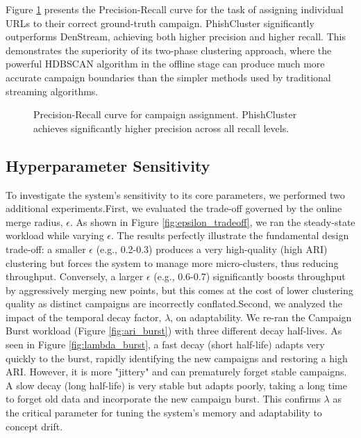 \documentclass[journal,article,submit,pdftex,moreauthors]{Definitions/mdpi}
\begin{document}
Figure \ref{fig:pr_curve} presents the Precision-Recall curve for the task of assigning individual URLs to their correct ground-truth campaign. PhishCluster significantly outperforms DenStream, achieving both higher precision and higher recall. This demonstrates the superiority of its two-phase clustering approach, where the powerful HDBSCAN algorithm in the offline stage can produce much more accurate campaign boundaries than the simpler methods used by traditional streaming algorithms.

\begin{figure}[h!]
\centering
{}
\caption{Precision-Recall curve for campaign assignment. PhishCluster achieves significantly higher precision across all recall levels.}
\label{fig:pr_curve}
\end{figure}


\subsection{Hyperparameter Sensitivity}
To investigate the system's sensitivity to its core parameters, we performed two additional experiments.First, we evaluated the trade-off governed by the online merge radius, $\epsilon$. As shown in Figure \ref{fig:epsilon_tradeoff}, we ran the steady-state workload while varying $\epsilon$. The results perfectly illustrate the fundamental design trade-off: a smaller $\epsilon$ (e.g., 0.2-0.3) produces a very high-quality (high ARI) clustering but forces the system to manage more micro-clusters, thus reducing throughput. Conversely, a larger $\epsilon$ (e.g., 0.6-0.7) significantly boosts throughput by aggressively merging new points, but this comes at the cost of lower clustering quality as distinct campaigns are incorrectly conflated.Second, we analyzed the impact of the temporal decay factor, $\lambda$, on adaptability. We re-ran the Campaign Burst workload (Figure \ref{fig:ari_burst}) with three different decay half-lives. As seen in Figure \ref{fig:lambda_burst}, a fast decay (short half-life) adapts very quickly to the burst, rapidly identifying the new campaigns and restoring a high ARI. However, it is more "jittery" and can prematurely forget stable campaigns. A slow decay (long half-life) is very stable but adapts poorly, taking a long time to forget old data and incorporate the new campaign burst. This confirms $\lambda$ as the critical parameter for tuning the system's memory and adaptability to concept drift.
\end{document}
